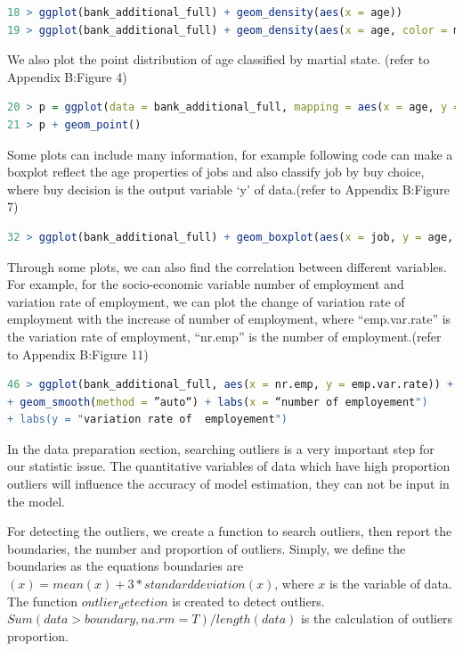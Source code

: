 \documentclass[12pt, a4paper, bibliography=totoc, english]{scrartcl}
\begin{document}
\begin{lstlisting}[language = R]
18 > ggplot(bank_additional_full) + geom_density(aes(x = age))
19 > ggplot(bank_additional_full) + geom_density(aes(x = age, color = marital))
\end{lstlisting}

We also plot the point distribution of age classified by martial state. (refer to Appendix B:Figure 4)


\begin{lstlisting}[language = R]
20 > p = ggplot(data = bank_additional_full, mapping = aes(x = age, y = marital))
21 > p + geom_point()  
\end{lstlisting}

Some plots can include many information, for example following code can make a boxplot reflect the age properties of jobs and also classify job by buy choice, where buy decision is the output variable `y' of data.(refer to Appendix B:Figure 7)

\begin{lstlisting}[language = R]
32 > ggplot(bank_additional_full) + geom_boxplot(aes(x = job, y = age, fill = buy))
\end{lstlisting}

Through some plots, we can also find the correlation between different variables. For example, for the socio-economic variable number of employment and variation rate of employment, we can plot the change of variation rate of employment with the increase of number of employment, where “emp.var.rate” is the variation rate of employment, “nr.emp” is the number of employment.(refer to Appendix B:Figure 11)
\begin{lstlisting}[language = R]
46 > ggplot(bank_additional_full, aes(x = nr.emp, y = emp.var.rate)) + geom_point() 
+ geom_smooth(method = ”auto“) + labs(x = “number of employement") 
+ labs(y = "variation rate of  employement")
\end{lstlisting}

In the data preparation section, searching outliers is a very important step for our statistic issue. The quantitative variables of data which have high proportion outliers will influence the accuracy of model estimation, they can not be input in the model.       

For detecting the outliers, we create a function to search outliers, then report the boundaries, the number and proportion of outliers. Simply, we define the boundaries as the equations boundaries are $(x)=mean(x)+3*standard deviation(x)$, where $x$ is the variable of data.
The function $outlier_detection$ is created to detect outliers.$Sum(data > boundary,na.rm = T)/length(data)$ is the calculation of outliers proportion.  
\end{document}
